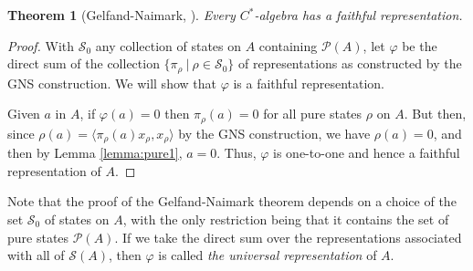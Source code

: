 \documentclass[12pt,a4paper]{report}
\theoremstyle{plain}
\newtheorem{thm}{Theorem}
\theoremstyle{definition}
\newcommand{\1}{\mathbbm{1}}
\renewcommand{\phi}{\varphi}
\renewcommand{\S}{\mathscr{S}}
\renewcommand{\P}[1]{\mathscr{P}(#1)}
\begin{document}
\begin{thm}[Gelfand-Naimark, {\cite[4.5.6]{kadison83}}]
	Every $C^\ast$-algebra has a faithful representation.
\end{thm}
\begin{proof}
	With $\S_0$ any collection of states on $A$ containing $\P{A}$, let $\phi$ be the direct sum of
	the collection $\{\pi_\rho ~|~ \rho\in\S_0\}$ of representations as constructed by the GNS
	construction. We will show that $\phi$ is a faithful representation.
	
	Given $a$ in $A$, if $\phi(a)=0$ then $\pi_\rho(a)=0$ for all pure states $\rho$ on $A$. But then,
	since $\rho(a)=\langle \pi_\rho (a) x_\rho, x_\rho \rangle$ by the GNS construction, we have 
	$\rho(a)=0$, and then by Lemma \ref{lemma:pure1}, $a=0$. Thus, $\phi$ is one-to-one and hence a 
	faithful representation of $A$.
\end{proof}

Note that the proof of the Gelfand-Naimark theorem depends on a choice of the set $\S_0$ of states on 
$A$, with the only restriction being that it contains the set of pure states $\P A$. If we take the 
direct sum over the representations associated with all of $\S (A)$, then $\phi$ is called \emph{the 
universal representation} of $A$.


\end{document}
